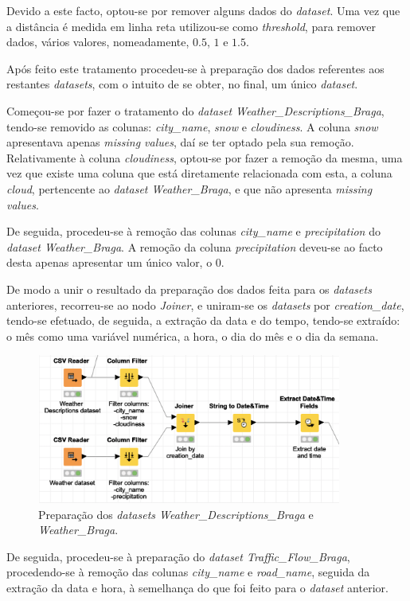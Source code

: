\documentclass[a4paper, 12pt]{article}
\begin{document}
Devido a este facto, optou-se por remover alguns dados do \textit{dataset}. Uma vez que a distância é medida em linha reta utilizou-se como \textit{threshold}, para remover dados, vários valores, nomeadamente, $0.5$, $1$ e $1.5$.

Após feito este tratamento procedeu-se à preparação dos dados referentes aos restantes \textit{datasets}, com o intuito de se obter, no final, um único \textit{dataset}.

Começou-se por fazer o tratamento do \textit{dataset Weather\_Descriptions\_Braga}, tendo-se removido as colunas: \textit{city\_name}, \textit{snow} e \textit{cloudiness}. A coluna \textit{snow} apresentava apenas \textit{missing values}, daí se ter optado pela sua remoção. Relativamente à  coluna \textit{cloudiness}, optou-se por fazer a remoção da mesma, uma vez que existe uma coluna que está diretamente relacionada com esta, a coluna \textit{cloud}, pertencente ao \textit{dataset Weather\_Braga}, e que não apresenta \textit{missing values}.

De seguida, procedeu-se à remoção das colunas \textit{city\_name} e \textit{precipitation} do \textit{dataset Weather\_Braga}. A remoção da coluna \textit{precipitation} deveu-se ao facto desta apenas apresentar um único valor, o $0$. 

De modo a unir o resultado da preparação dos dados feita para os \textit{datasets} anteriores, recorreu-se ao nodo \textit{Joiner}, e uniram-se os \textit{datasets} por \textit{creation\_date}, tendo-se efetuado, de seguida, a extração da data e do tempo, tendo-se extraído: o mês como uma variável numérica, a hora, o dia do mês e o dia da semana.

\begin{figure}[H]
	\centering
	\includegraphics[width=10cm]{weather}
	\caption{Preparação dos \textit{datasets Weather\_Descriptions\_Braga} e \textit{Weather\_Braga}.}
\end{figure}

De seguida, procedeu-se à preparação do \textit{dataset Traffic\_Flow\_Braga}, procedendo-se à remoção das colunas \textit{city\_name} e \textit{road\_name}, seguida da extração da data e hora, à semelhança do que foi feito para o \textit{dataset} anterior.
\end{document}
